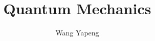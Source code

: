 \documentclass[a4paper]{book}%
\begin{document}
\title{Quantum Mechanics}
\author{Wang Yapeng}

\maketitle
\frontmatter


\mainmatter
\tableofcontents







\appendix

\printglossaries
{}

\backmatter 
\end{document}
